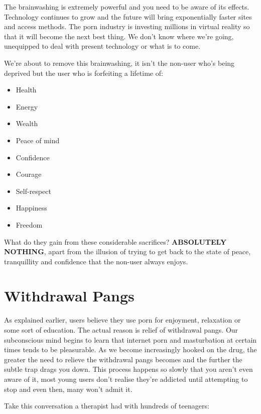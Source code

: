 \documentclass[
]{book}
\begin{document}
The brainwashing is extremely powerful and you need to be aware of its effects. Technology continues to grow and the future will bring exponentially faster sites and access methods. The porn industry is investing millions in virtual reality so that it will become the next best thing. We don't know where we're going, unequipped to deal with present technology or what is to come.

We're about to remove this brainwashing, it isn't the non-user who's being deprived but the user who is forfeiting a lifetime of:

\begin{itemize}
\item
  Health
\item
  Energy
\item
  Wealth
\item
  Peace of mind
\item
  Confidence
\item
  Courage
\item
  Self-respect
\item
  Happiness
\item
  Freedom
\end{itemize}

What do they gain from these considerable sacrifices? \textbf{ABSOLUTELY NOTHING}, apart from the illusion of trying to get back to the state of peace, tranquillity and confidence that the non-user always enjoys.

\hypertarget{withdrawal-pangs}{%
\section{Withdrawal Pangs}\label{withdrawal-pangs}}

As explained earlier, users believe they use porn for enjoyment, relaxation or some sort of education. The actual reason is relief of withdrawal pangs. Our subconscious mind begins to learn that internet porn and masturbation at certain times tends to be pleasurable. As we become increasingly hooked on the drug, the greater the need to relieve the withdrawal pangs becomes and the further the subtle trap drags you down. This process happens so slowly that you aren't even aware of it, most young users don't realise they're addicted until attempting to stop and even then, many won't admit it.

Take this conversation a therapist had with hundreds of teenagers:
\end{document}
